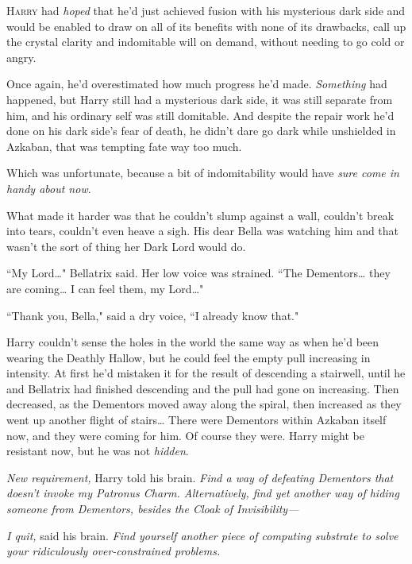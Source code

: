 
\lettrine{H}{arry} had \emph{hoped} that he'd just achieved fusion with his mysterious dark side and would be enabled to draw on all of its benefits with none of its drawbacks, call up the crystal clarity and indomitable will on demand, without needing to go cold or angry.

Once again, he'd overestimated how much progress he'd made. \emph{Something} had happened, but Harry still had a mysterious dark side, it was still separate from him, and his ordinary self was still domitable. And despite the repair work he'd done on his dark side's fear of death, he didn't dare go dark while unshielded in Azkaban, that was tempting fate way too much.

Which was unfortunate, because a bit of indomitability would have \emph{sure come in handy about now}.

What made it harder was that he couldn't slump against a wall, couldn't break into tears, couldn't even heave a sigh. His dear Bella was watching him and that wasn't the sort of thing her Dark Lord would do.

``My Lord{\ldots}" Bellatrix said. Her low voice was strained. ``The Dementors{\ldots} they are coming{\ldots} I can feel them, my Lord{\ldots}"

``Thank you, Bella," said a dry voice, ``I already know that."

Harry couldn't sense the holes in the world the same way as when he'd been wearing the Deathly Hallow, but he could feel the empty pull increasing in intensity. At first he'd mistaken it for the result of descending a stairwell, until he and Bellatrix had finished descending and the pull had gone on increasing. Then decreased, as the Dementors moved away along the spiral, then increased as they went up another flight of stairs{\ldots} There were Dementors within Azkaban itself now, and they were coming for him. Of course they were. Harry might be resistant now, but he was not \emph{hidden}.

\emph{New requirement,} Harry told his brain. \emph{Find a way of defeating Dementors that doesn't invoke my Patronus Charm. Alternatively, find yet another way of hiding someone from Dementors, besides the Cloak of Invisibility—}

\emph{I quit,} said his brain. \emph{Find yourself another piece of computing substrate to solve your ridiculously over-constrained problems.}

